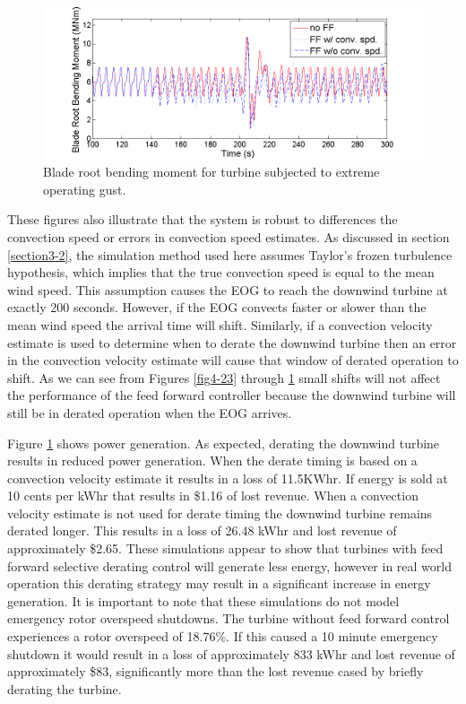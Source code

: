 \begin{figure}[htbp]
	\centering
		\includegraphics[trim = {1cm 0 2cm 0}, clip, width = \linewidth]{Figures/ch4Figures/fig4-25.png}
		
	\caption{Blade root bending moment for turbine subjected to extreme operating gust.}
	\label{fig4-25}
\end{figure}



These figures also illustrate that the system is robust to differences the convection speed or errors in convection speed estimates. As discussed in section \ref{section3-2}, the simulation method used here assumes Taylor's frozen turbulence hypothesis, which implies that the true convection speed is equal to the mean wind speed. This assumption causes the EOG to reach the downwind turbine at exactly 200 seconds. However, if the EOG convects faster or slower than the mean wind speed the arrival time will shift. Similarly, if a convection velocity estimate is used to determine when to derate the downwind turbine then an error in the convection velocity estimate will cause that window of derated operation to shift. As we can see from Figures \ref{fig4-23} through \ref{fig4-25} small shifts will not affect the performance of the feed forward controller because the downwind turbine will still be in derated operation when the EOG arrives.

Figure \ref{fig4-25} shows power generation. As expected, derating the downwind turbine results in reduced power generation. When the derate timing is based on a convection velocity estimate it results in a loss of 11.5KWhr. If energy is sold at 10 cents per kWhr that results in \$1.16 of lost revenue. When a convection velocity estimate is not used for derate timing the downwind turbine remains derated longer. This results in a loss of 26.48 kWhr and lost revenue of approximately \$2.65. These simulations appear to show that turbines with feed forward selective derating control will generate less energy, however in real world operation this derating strategy may result in a significant increase in energy generation. It is important to note that these simulations do not model emergency rotor overspeed shutdowns. The turbine without feed forward control experiences a rotor overspeed of 18.76\%. If this caused a 10 minute emergency shutdown it would result in a loss of approximately 833 kWhr and lost revenue of approximately \$83, significantly more than the lost revenue cased by briefly derating the turbine.


